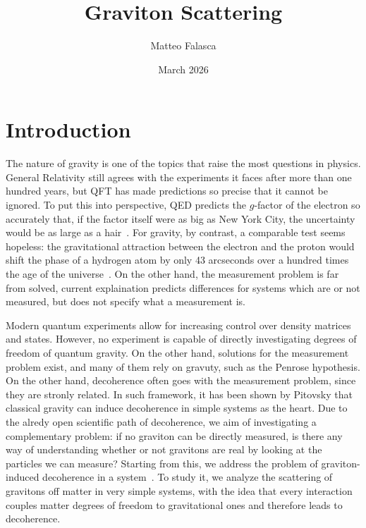 \documentclass[12pt,a4paper,oneside]{article}
\title{Graviton Scattering}
\author{Matteo Falasca}
\date{March 2026}
\numberwithin{equation}{section}   %
\begin{document}
\maketitle




\section{Introduction}
The nature of gravity is one of the topics that raise the most questions
in physics. General Relativity still agrees with the experiments it faces
after more than one hundred years, but QFT has made predictions so precise
that it cannot be ignored. To put this into perspective, QED predicts the
$g$-factor of the electron so accurately that, if the factor itself were as
big as New York City, the uncertainty would be as large as a
hair~\cite{GreinerQED}. For gravity, by contrast, a comparable test seems hopeless:
the gravitational attraction between the electron and the proton would shift
the phase of a hydrogen atom by only 43 arcseconds over a hundred times the
age of the universe~\cite{Feynman1963}. On the other hand, the measurement
problem is far from solved, current explaination predicts differences for systems
which are or not measured, but does not specify what a measurement is.


Modern quantum experiments allow for increasing control over density matrices
and states. However, no experiment is capable of directly investigating degrees
of freedom
of quantum gravity. On the other hand, solutions for the measurement problem exist,
and many of them rely on gravuty, such as the Penrose hypothesis. On the other hand,
decoherence often goes with the measurement problem, since they are stronly 
related. In such framework, it has been shown by Pitovsky that classical
gravity can induce decoherence in simple systems as the heart. 
Due to the alredy open scientific path of decoherence, we aim of investigating
a complementary
problem: if no graviton can be directly measured, is there any way of
understanding whether or not gravitons are real by looking at the particles
we can measure?
Starting from this, we address the problem of graviton-induced decoherence
in a system~\cite{Blencowe2013}. To study it, we analyze the scattering of gravitons off matter
in very simple systems, with the idea that every interaction couples matter
degrees of freedom to gravitational ones and therefore leads to decoherence.
\end{document}
